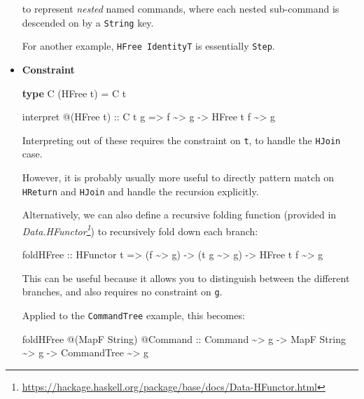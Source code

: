 \documentclass[]{article}
\newenvironment{Shaded}{}{}
\newcommand{\DataTypeTok}[1]{\textcolor[rgb]{0.56,0.13,0.00}{#1}}
\newcommand{\KeywordTok}[1]{\textcolor[rgb]{0.00,0.44,0.13}{\textbf{#1}}}
\newcommand{\NormalTok}[1]{#1}
\newcommand{\OperatorTok}[1]{\textcolor[rgb]{0.40,0.40,0.40}{#1}}
\newcommand{\OtherTok}[1]{\textcolor[rgb]{0.00,0.44,0.13}{#1}}
\renewcommand{\href}[2]{#2\footnote{\url{#1}}}
\begin{document}
\begin{itemize}
  to represent \emph{nested} named commands, where each nested sub-command is
  descended on by a \texttt{String} key.

  For another example, \texttt{HFree\ IdentityT} is essentially \texttt{Step}.
\item
  \textbf{Constraint}

\begin{Shaded}
\begin{Highlighting}[]
\KeywordTok{type} \DataTypeTok{C}\NormalTok{ (}\DataTypeTok{HFree}\NormalTok{ t) }\OtherTok{=} \DataTypeTok{C}\NormalTok{ t}

\NormalTok{interpret }\OperatorTok{@}\NormalTok{(}\DataTypeTok{HFree}\NormalTok{ t)}
\OtherTok{    ::} \DataTypeTok{C}\NormalTok{ t g}
    \OtherTok{=>}\NormalTok{ f }\OperatorTok{\textasciitilde{}>}\NormalTok{ g}
    \OtherTok{{-}>} \DataTypeTok{HFree}\NormalTok{ t f }\OperatorTok{\textasciitilde{}>}\NormalTok{ g}
\end{Highlighting}
\end{Shaded}

  Interpreting out of these requires the constraint on \texttt{t}, to handle the
  \texttt{HJoin} case.

  However, it is probably usually more useful to directly pattern match on
  \texttt{HReturn} and \texttt{HJoin} and handle the recursion explicitly.

  Alternatively, we can also define a recursive folding function (provided in
  \emph{\href{https://hackage.haskell.org/package/base/docs/Data-HFunctor.html}{Data.HFunctor}})
  to recursively fold down each branch:

\begin{Shaded}
\begin{Highlighting}[]
\NormalTok{foldHFree}
\OtherTok{    ::} \DataTypeTok{HFunctor}\NormalTok{ t}
    \OtherTok{=>}\NormalTok{ (f }\OperatorTok{\textasciitilde{}>}\NormalTok{ g)}
    \OtherTok{{-}>}\NormalTok{ (t g }\OperatorTok{\textasciitilde{}>}\NormalTok{ g)}
    \OtherTok{{-}>} \DataTypeTok{HFree}\NormalTok{ t f }\OperatorTok{\textasciitilde{}>}\NormalTok{ g}
\end{Highlighting}
\end{Shaded}

  This can be useful because it allows you to distinguish between the different
  branches, and also requires no constraint on \texttt{g}.

  Applied to the \texttt{CommandTree} example, this becomes:

\begin{Shaded}
\begin{Highlighting}[]
\NormalTok{foldHFree }\OperatorTok{@}\NormalTok{(}\DataTypeTok{MapF} \DataTypeTok{String}\NormalTok{) }\OperatorTok{@}\DataTypeTok{Command}
\OtherTok{    ::} \DataTypeTok{Command} \OperatorTok{\textasciitilde{}>}\NormalTok{ g}
    \OtherTok{{-}>} \DataTypeTok{MapF} \DataTypeTok{String} \OperatorTok{\textasciitilde{}>}\NormalTok{ g}
    \OtherTok{{-}>} \DataTypeTok{CommandTree} \OperatorTok{\textasciitilde{}>}\NormalTok{ g}
\end{Highlighting}
\end{Shaded}
\end{itemize}
\end{document}
